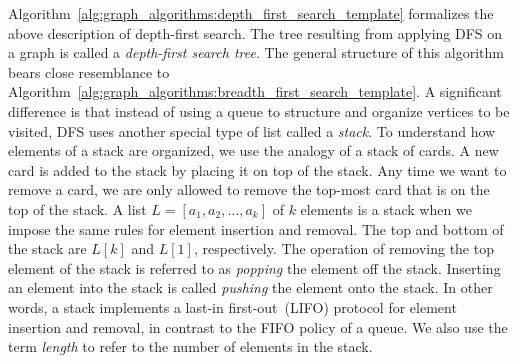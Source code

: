 Algorithm~\ref{alg:graph_algorithms:depth_first_search_template}
formalizes the above description of depth-first
search. The tree resulting from applying
DFS on a graph is called a
\emph{depth-first search tree}. The
general structure of this algorithm bears close resemblance to
Algorithm~\ref{alg:graph_algorithms:breadth_first_search_template}. A
significant difference is that instead of using a queue
to structure and organize vertices to be visited, DFS uses
another special type of list called a
\emph{stack}. To understand how elements of a stack are
organized, we use the analogy of a stack of cards. A new
card is added to the stack by placing it on top of the stack. Any time
we want to remove a card, we are only allowed to remove the top-most
card that is on the top of the stack. A list
$L = [a_1, a_2, \dots, a_k]$ of $k$ elements is a stack when we impose
the same rules for element insertion and removal. The top and bottom
of the stack are $L[k]$ and $L[1]$, respectively. The operation of
removing the top element of the stack is referred to as
\emph{popping} the element off the stack. Inserting
an element into the stack is called \emph{pushing}
the element onto the stack. In other words, a stack implements a
last-in first-out~(LIFO)
protocol for element insertion and removal, in contrast to the
FIFO policy of a queue. We also use the term
\emph{length} to refer to the number of elements
in the stack.

